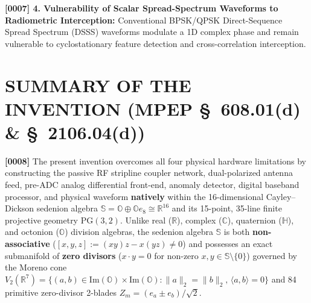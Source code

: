 \documentclass[12pt,letterpaper]{article}
\begin{document}
\textbf{[0007] 4. Vulnerability of Scalar Spread-Spectrum Waveforms to Radiometric Interception:} Conventional BPSK/QPSK Direct-Sequence Spread Spectrum (DSSS) waveforms modulate a 1D complex phase and remain vulnerable to cyclostationary feature detection and cross-correlation interception.

\section*{SUMMARY OF THE INVENTION (MPEP \S\ 608.01(d) \& \S\ 2106.04(d))}
\textbf{[0008]} The present invention overcomes all four physical hardware limitations by constructing the passive RF stripline coupler network, dual-polarized antenna feed, pre-ADC analog differential front-end, anomaly detector, digital baseband processor, and physical waveform \textbf{natively} within the 16-dimensional Cayley--Dickson sedenion algebra $\mathbb{S} = \mathbb{O} \oplus \mathbb{O}e_8 \cong \mathbb{R}^{16}$ and its 15-point, 35-line finite projective geometry $\mathrm{PG}(3,2)$. Unlike real ($\mathbb{R}$), complex ($\mathbb{C}$), quaternion ($\mathbb{H}$), and octonion ($\mathbb{O}$) division algebras, the sedenion algebra $\mathbb{S}$ is both \textbf{non-associative} ($[x,y,z] := (xy)z - x(yz) \neq 0$) and possesses an exact submanifold of \textbf{zero divisors} ($x \cdot y = 0$ for non-zero $x, y \in \mathbb{S}\setminus\{0\}$) governed by the Moreno cone $V_2(\mathbb{R}^7) = \{(a,b) \in \mathrm{Im}(\mathbb{O})\times\mathrm{Im}(\mathbb{O}) : \|a\|_2 = \|b\|_2,\, \langle a,b\rangle = 0\}$ and 84 primitive zero-divisor 2-blades $Z_m = (e_a \pm e_b)/\sqrt{2}$.
\end{document}
